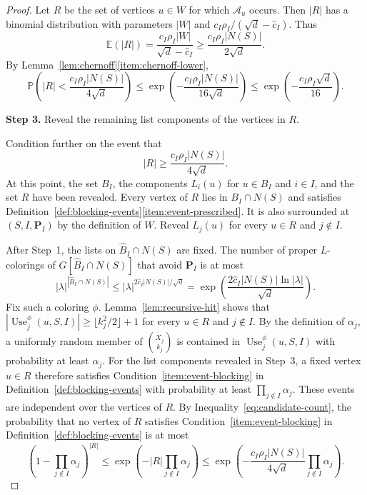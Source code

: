 \documentclass[12pt]{article}
\numberwithin{equation}{section}
\theoremstyle{definition}
\newcommand{\Prob}{\mathbb{P}}
\newcommand{\Ex}{\mathbb{E}}
\newcommand{\Use}{\operatorname{Use}}
\begin{document}
\begin{proof}
Let $R$ be the set of vertices $u\in W$ for which $\mathcal A_u$ occurs.
Then $|R|$ has a binomial distribution with parameters $|W|$ and
$c_I\rho_I/(\sqrt d-\hat c_I)$. Thus
\[
\Ex(|R|)
=\frac{c_I\rho_I|W|}{\sqrt d-\hat c_I}
\geq\frac{c_I\rho_I|N(S)|}{2\sqrt d}.
\]
By Lemma~\ref{lem:chernoff}\ref{item:chernoff-lower},
\begin{equation}\label{eq:candidate-tail}
 \Prob\left(
 |R| < \frac{c_I\rho_I|N(S)|}{4\sqrt{d}}
 \right)
 \leq \exp\left(-\frac{c_I\rho_I|N(S)|}{16\sqrt{d}}\right)
 \leq \exp\left(-\frac{c_I\rho_I\sqrt{d}}{16}\right).
\end{equation}

\medskip
\noindent
\textbf{Step 3.} Reveal the remaining list components of the vertices in $R$.
\par\nobreak
\medskip

Condition further on the event that
\begin{equation}\label{eq:candidate-count}
 |R| \geq \frac{c_I\rho_I|N(S)|}{4\sqrt{d}}.
\end{equation}
At this point, the set $B_I$, the components $L_i(u)$ for $u\in B_I$ and
$i\in I$, and the set $R$ have been revealed.
Every vertex of $R$ lies in $B_I \cap N(S)$ and satisfies
Definition~\ref{def:blocking-events}\ref{item:event-prescribed}. It is also
surrounded at $(S,I,\mathbf{P}_I)$ by the definition of $W$. Reveal
$L_j(u)$ for every $u \in R$ and $j \notin I$.

After Step~1, the lists on $\hat{B}_{I} \cap N(S)$ are fixed. The number of
proper $L$-colorings of
$G[\hat{B}_{I} \cap N(S)]$ that avoid $\mathbf{P}_I$ is at most
\begin{equation}\label{eq:number-upper-colorings}
 |\lambda|^{|\hat{B}_{I} \cap N(S)|}
 \leq |\lambda|^{2\hat{c}_{I}|N(S)|/\sqrt{d}}
 = \exp\left(
 \frac{2\hat{c}_{I}|N(S)|\ln |\lambda|}{\sqrt{d}}
 \right).
\end{equation}
Fix such a coloring $\phi$. Lemma~\ref{lem:recursive-hit} shows that
$|\Use_j^\phi(u,S,I)|\geq\lfloor k_j^2/2\rfloor+1$ for every $u\in R$ and
$j\notin I$. By
the definition of $\alpha_j$, a uniformly random member of
$\binom{X_j}{k_j}$ is contained in $\Use_j^\phi(u, S, I)$ with probability
at least $\alpha_j$. For the list components revealed in Step~3, a fixed
vertex $u \in R$ therefore satisfies Condition~\ref{item:event-blocking} in
Definition~\ref{def:blocking-events} with probability at least
$\prod_{j \notin I}\alpha_j$. These events are independent over the vertices
of $R$. By Inequality~\eqref{eq:candidate-count}, the probability that no vertex of $R$
satisfies Condition~\ref{item:event-blocking} in
Definition~\ref{def:blocking-events} is at most
\[
 \left(1 - \prod_{j \notin I}\alpha_j\right)^{|R|}
 \leq \exp\left(-|R|\prod_{j \notin I}\alpha_j\right)
 \leq \exp\left(
 -\frac{c_I\rho_I|N(S)|}{4\sqrt{d}}
 \prod_{j \notin I}\alpha_j
 \right).
\]


\end{proof}
\end{document}
